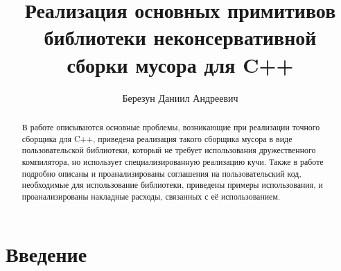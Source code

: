 
\title{Реализация основных примитивов\\ 
библиотеки неконсервативной\\
сборки мусора для C++}
%
\author{Березун Даниил Андреевич}

%
%
%

\maketitle              %

\begin{abstract}
В работе описываются основные проблемы, возникающие при реализации точного сборщика для C++, приведена реализация 
такого сборщика мусора в виде пользовательской библиотеки, который не требует использования дружественного компилятора, 
но использует специализированную реализацию кучи. Также в работе подробно описаны и проанализированы соглашения на пользовательский код, 
необходимые для использование библиотеки, приведены примеры использования, и проанализированы накладные расходы, связанных 
с её использованием.
\end{abstract}

\section*{Введение}

